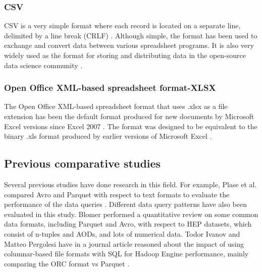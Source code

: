\subsubsection{CSV}
\gls{CSV} is a very simple format where each record is located on a separate line, delimited by a line break (CRLF) \cite{shafranovich_common_2005}. Although simple, the format has been used to exchange and convert data between various spreadsheet programs. It is also very widely used as the format for storing and distributing data in the open-source data science community \cite{shafranovich_common_2005, cao_data_2017}.

\subsubsection{Open Office XML-based spreadsheet format-XLSX}
The Open Office XML-based spreadsheet format that uses .xlsx as a file extension has been the default format produced for new documents by Microsoft Excel versions since Excel 2007 \cite{noauthor_xlsx_2022}. The format was designed to be equivalent to the binary .xls format produced by earlier versions of Microsoft Excel \cite{noauthor_xlsx_2022, cao_data_2017}. 

\subsection{Previous comparative studies}
Several previous studies have done research in this field. For example, Plase et al. compared Avro and Parquet with respect to text formats to evaluate the performance of the data queries \cite{plase_comparison_2017}. Different data query patterns have also been evaluated in this study. Blomer performed a quantitative review on some common data formats, including Parquet and Avro, with respect to \gls{HEP} datasets, which consist of n-tuples and \glspl{AOD}, and lots of numerical data\cite{blomer_quantitative_2018}. Todor Ivanov and Matteo Pergolesi have in a journal article reasoned about the impact of using columnar-based file formats with SQL for Hadoop Engine performance, mainly comparing the ORC format vs Parquet \cite{ivanov_impact_2020, cao_data_2017}.
